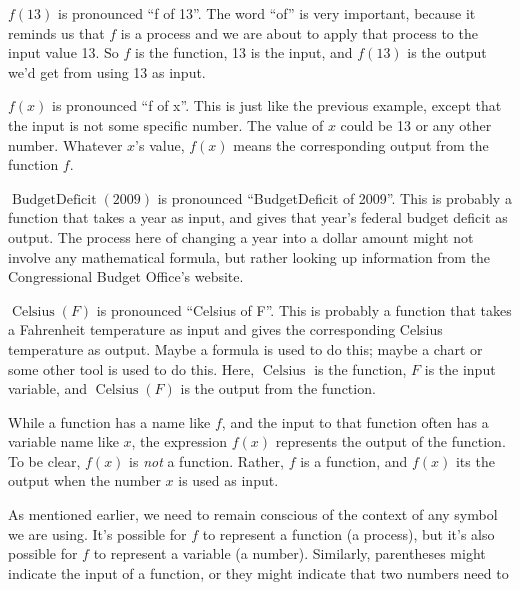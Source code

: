 %
\begin{example}\label{}
$f(\num{13})$ is pronounced ``f of 13''. The word ``of'' is very important,
        		because it reminds us that $f$ is a process and we are about to apply that
        		process to the input value \num{13}. So $f$ is the function, \num{13} is the
        		input, and $f(\num{13})$ is the output we'd get from using \num{13} as input.
%
\par $f(x)$ is pronounced ``f of x''. This is just like the previous example,
        		except that the input is not some specific number. The value of $x$ could be
        		\num{13} or any other number. Whatever $x$'s value, $f(x)$ means the corresponding
        		output from the function $f$.
%
\par $\operatorname{BudgetDeficit}(2009)$ is pronounced ``BudgetDeficit of 2009''.
        		This is probably a function that takes a year as input, and gives that
        		year's federal budget deficit as output. The process here of changing a year
        		into a dollar amount might not involve any mathematical formula, but rather
        		looking up information from the Congressional Budget Office's website.
%
\par $\operatorname{Celsius}(F)$ is pronounced ``Celsius of F''. This is probably
        		a function that takes a Fahrenheit temperature as input and gives the
        		corresponding Celsius temperature as output. Maybe a formula is used to do this;
        		maybe a chart or some other tool is used to do this. Here, $\operatorname{Celsius}$
        		is the function, $F$ is the input variable, and $\operatorname{Celsius}(F)$ is the output from the function.
%
\end{example}
%
\begin{specialnote}
While a function has a name like $f$, and the input to that function often
                	has a variable name like $x$, the expression $f(x)$ represents the output of
                	the function. To be clear, $f(x)$ is \emph{not} a function. Rather, $f$ is a
                	function, and $f(x)$ its the output when the number $x$ is used as input.\end{specialnote}
%
\par As mentioned earlier, we need to remain conscious of the context of any symbol we
       		are using. It's possible for $f$ to represent a function (a process), but it's also
       		possible for $f$ to represent a variable (a number). Similarly, parentheses might
       		indicate the input of a function, or they might indicate that two numbers need to
